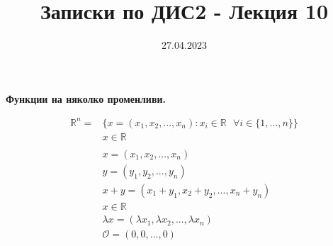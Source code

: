 \documentclass[12pt]{article}
\newcommand{\spc}{\text{ }}
\begin{document}
	\color{white}
	\pagecolor{darkgray}
	\title{Записки по ДИС2 - Лекция 10}
	\date{27.04.2023}
	\maketitle
	\begin{center}
		\Large 
		\textbf{Функции на няколко променливи.}
	\end{center}
	
	\begin{align*}\mathbb{R}^{n} = &\{x=(x_1,x_2,...,x_n):x_i\in\mathbb{R} \spc\forall i\in\{1,...,n\}\}\\
	&x\in\mathbb{R}\\
	\spc\\
	&x=(x_1,x_2,...,x_n)\\
	&y=(y_1,y_2,...,y_n)\\
	&x+y=(x_1+y_1,x_2+y_2,...,x_n+y_n)\\
	&x\in\mathbb{R}\\
	&\lambda x =(\lambda x_1, \lambda x_2, ..., \lambda x_n)\\
	&\mathcal{O} = (0,0,...,0)\\
	\end{align*}
\end{document}
